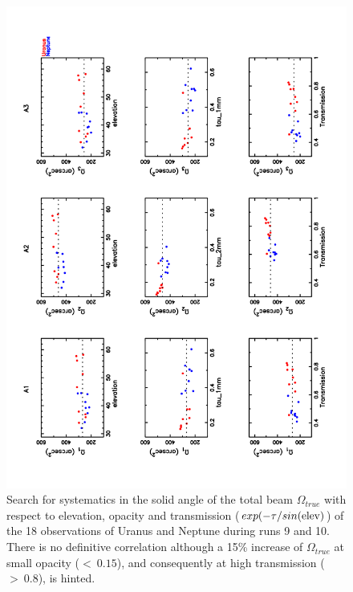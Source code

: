 \begin{figure}[h]
\begin{center}
  \includegraphics[clip, angle=-90, scale=0.6]{Figures/Omega_True_vs_elev_tau_transmission.pdf}
  \caption{Search for systematics in the solid angle of the total beam $\Omega_{true}$
   with respect to elevation, opacity and transmission ($exp(-\tau/sin({\rm elev})$) of the 18 observations
   of Uranus and Neptune during runs 9 and 10. There is no definitive correlation although a 15\% increase
   of $\Omega_{true}$ at small opacity ($<~0.15$), and consequently
  at high transmission ($>~0.8$), is hinted.}
\label{fig:Osystematics}
\end{center}
\end{figure}


